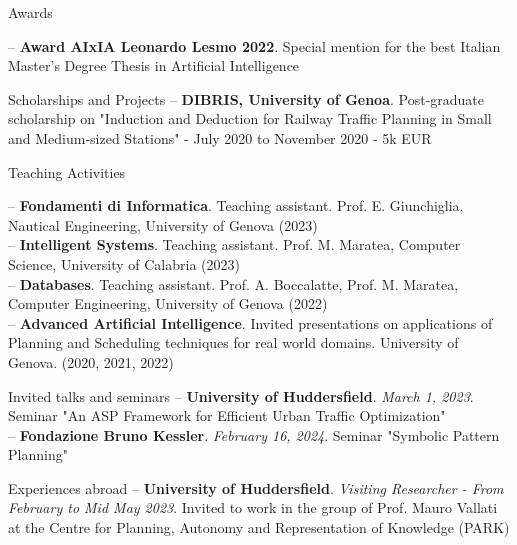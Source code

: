 \documentclass{resume} %
\begin{document}
\begin{rSection}{Awards}

-- \textbf{Award AIxIA Leonardo Lesmo 2022}. Special mention for the best Italian Master's Degree Thesis in Artificial Intelligence
\end{rSection}

\begin{rSection}{Scholarships and Projects}
-- \textbf{DIBRIS, University of Genoa}. Post-graduate scholarship on "Induction and Deduction for Railway Traffic Planning in Small and Medium-sized Stations" - July 2020 to November 2020 - 5k EUR
\end{rSection}

\begin{rSection}{Teaching Activities}

-- \textbf{Fondamenti di Informatica}. Teaching assistant. Prof. E. Giunchiglia, Nautical Engineering, University of Genova (2023)\\
-- \textbf{Intelligent Systems}. Teaching assistant. Prof. M. Maratea, Computer Science, University of Calabria (2023)\\
-- \textbf{Databases}. Teaching assistant. Prof. A. Boccalatte, Prof. M. Maratea, Computer Engineering, University of Genova (2022)\\
-- \textbf{Advanced Artificial Intelligence}. Invited presentations on applications of Planning and Scheduling techniques for real world domains. University of Genova. (2020, 2021, 2022)
\end{rSection}

\begin{rSection}{Invited talks and seminars}
-- \textbf{University of Huddersfield}. \textit{March 1, 2023}. Seminar "An ASP Framework for Efficient Urban Traffic Optimization"\\
-- \textbf{Fondazione Bruno Kessler}. \textit{February 16, 2024}. Seminar "Symbolic Pattern Planning"
\end{rSection}

\begin{rSection}{Experiences abroad}
-- \textbf{University of Huddersfield}. \textit{Visiting Researcher - From February to Mid May 2023}. Invited to work in the group of Prof. Mauro Vallati at the Centre for Planning, Autonomy and Representation of Knowledge (PARK)  
\end{rSection}
\end{document}
